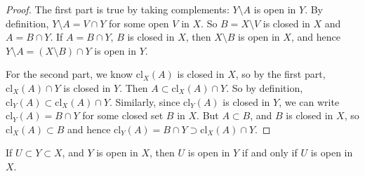 \begin{proof}
	The first part is true by taking complements: \( Y \setminus A \) is open in \( Y \).
	By definition, \( Y \setminus A = V \cap Y \) for some open \( V \) in \( X \).
	So \( B = X \setminus V \) is closed in \( X \) and \( A = B \cap Y \).
	If \( A = B \cap Y \), \( B \) is closed in \( X \), then \( X \setminus B \) is open in \( X \), and hence \( Y \setminus A = (X \setminus B) \cap Y \) is open in \( Y \).

	For the second part, we know \( \mathrm{cl}_X(A) \) is closed in \( X \), so by the first part, \( \mathrm{cl}_X(A) \cap Y \) is closed in \( Y \).
	Then \( A \subset \mathrm{cl}_X(A) \cap Y \).
	So by definition, \( \mathrm{cl}_Y(A) \subset \mathrm{cl}_X(A) \cap Y \).
	Similarly, since \( \mathrm{cl}_Y(A) \) is closed in \( Y \), we can write \( \mathrm{cl}_Y(A) = B \cap Y \) for some closed set \( B \) in \( X \).
	But \( A \subset B \), and \( B \) is closed in \( X \), so \( \mathrm{cl}_X(A) \subset B \) and hence \( \mathrm{cl}_Y(A) = B \cap Y \supset \mathrm{cl}_X(A) \cap Y \).
\end{proof}
\begin{remark}
	If \( U \subset Y \subset X \), and \( Y \) is open in \( X \), then \( U \) is open in \( Y \) if and only if \( U \) is open in \( X \).
\end{remark}

